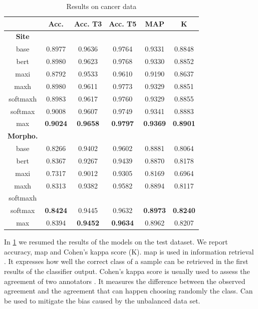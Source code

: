 \begin{table}
  \centering
  \caption{Results on cancer data}
  \label{tab:results}
  \begin{tabular}{|c|c|c|c|c|c|}
    \hline
    &Acc.&Acc. T3&Acc. T5&MAP&K\\
    \hline
    \hline
    \textbf{Site}&&&&&\\
    base&0.8977&0.9636&0.9764&0.9331&0.8848\\
    \acs{bert}&0.8980&0.9623&0.9768&0.9330&0.8852\\
    \acs{maxi}&0.8792&0.9533&0.9610&0.9190&0.8637\\
    \acs{maxh}&0.8980&0.9611&0.9773&0.9329&0.8851\\
    \acs{softmaxh}&0.8983&0.9617&0.9760&0.9329&0.8855\\
    \acs{softmax}&0.9008&0.9607&0.9749&0.9341&0.8883\\
    \acs{max}&\textbf{0.9024}&\textbf{0.9658}&\textbf{0.9797}&\textbf{0.9369}&\textbf{0.8901}\\
    \hline
    \hline
    \textbf{Morpho.}&&&&&\\
    base&0.8266&0.9402&0.9602&0.8881&0.8064\\
    \acs{bert}&0.8367&0.9267&0.9439&0.8870&0.8178\\
    \acs{maxi}&0.7317&0.9012&0.9305&0.8169&0.6964\\
    \acs{maxh}&0.8313&0.9382&0.9582&0.8894&0.8117\\
    \acs{softmaxh}&&&&&\\
    \acs{softmax}&\textbf{0.8424}&0.9445&0.9632&\textbf{0.8973}&\textbf{0.8240}\\
    \acs{max}&0.8394&\textbf{0.9452}&\textbf{0.9634}&0.8962&0.8207\\
    \hline
  \end{tabular}
\end{table}
In \cref{tab:results} we resumed the results of the models on the test
dataset. We report accuracy, \ac{map} and Cohen's kappa score (K).
\ac{map} is used in information
retrieval \cite{manning_introduction_2008}. It expresses how well the
correct class of a sample can be retrieved in 
the first results of the classifier output.
Cohen's kappa score is usually used to assess
the agreement of two annotators \cite{cohen_coefficient_1960}. It
measures the difference between the observed agreement and the
agreement that can happen choosing randomly the class. Can be used to
mitigate the bias caused by the unbalanced data set.

